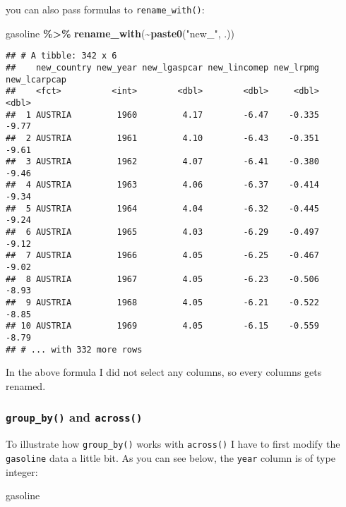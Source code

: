 \documentclass[
]{article}
\newenvironment{Shaded}{\begin{snugshade}}{\end{snugshade}}
\newcommand{\KeywordTok}[1]{\textcolor[rgb]{0.13,0.29,0.53}{\textbf{#1}}}
\newcommand{\NormalTok}[1]{#1}
\newcommand{\OperatorTok}[1]{\textcolor[rgb]{0.81,0.36,0.00}{\textbf{#1}}}
\newcommand{\StringTok}[1]{\textcolor[rgb]{0.31,0.60,0.02}{#1}}
\begin{document}
you can also pass formulas to \texttt{rename\_with()}:

\begin{Shaded}
\begin{Highlighting}[]
\NormalTok{gasoline }\OperatorTok{\%\textgreater{}\%}\StringTok{  }
\StringTok{  }\KeywordTok{rename\_with}\NormalTok{(}\OperatorTok{\textasciitilde{}}\KeywordTok{paste0}\NormalTok{(}\StringTok{"new\_"}\NormalTok{, .))}
\end{Highlighting}
\end{Shaded}

\begin{verbatim}
## # A tibble: 342 x 6
##    new_country new_year new_lgaspcar new_lincomep new_lrpmg new_lcarpcap
##    <fct>          <int>        <dbl>        <dbl>     <dbl>        <dbl>
##  1 AUSTRIA         1960         4.17        -6.47    -0.335        -9.77
##  2 AUSTRIA         1961         4.10        -6.43    -0.351        -9.61
##  3 AUSTRIA         1962         4.07        -6.41    -0.380        -9.46
##  4 AUSTRIA         1963         4.06        -6.37    -0.414        -9.34
##  5 AUSTRIA         1964         4.04        -6.32    -0.445        -9.24
##  6 AUSTRIA         1965         4.03        -6.29    -0.497        -9.12
##  7 AUSTRIA         1966         4.05        -6.25    -0.467        -9.02
##  8 AUSTRIA         1967         4.05        -6.23    -0.506        -8.93
##  9 AUSTRIA         1968         4.05        -6.21    -0.522        -8.85
## 10 AUSTRIA         1969         4.05        -6.15    -0.559        -8.79
## # ... with 332 more rows
\end{verbatim}

In the above formula I did not select any columns, so every columns gets renamed.

\hypertarget{group_by-and-across}{%
\subsubsection{\texorpdfstring{\texttt{group\_by()} and \texttt{across()}}{group\_by() and across()}}\label{group_by-and-across}}

To illustrate how \texttt{group\_by()} works with \texttt{across()} I have to first modify the
\texttt{gasoline} data a little bit. As you can see below, the \texttt{year} column is of type integer:

\begin{Shaded}
\begin{Highlighting}[]
\NormalTok{gasoline}
\end{Highlighting}
\end{Shaded}
\end{document}
